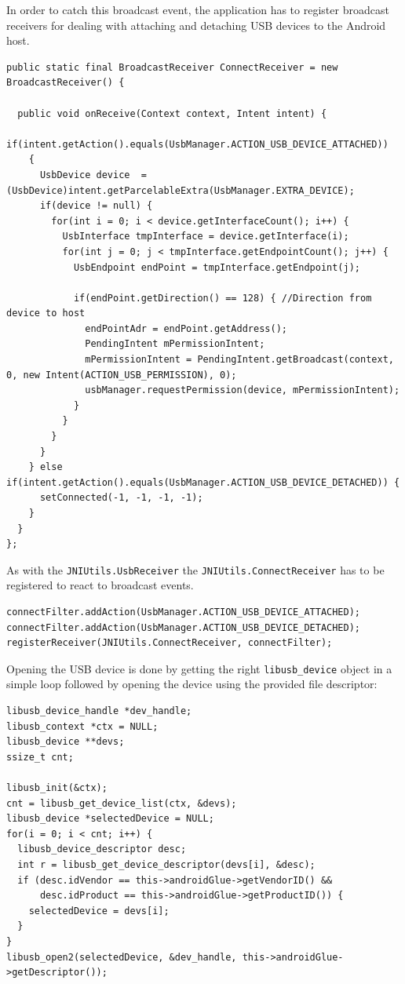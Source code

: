 In order to catch this broadcast event, the application has to register broadcast receivers for dealing with attaching and detaching USB devices to the Android host.

\begin{lstlisting}
public static final BroadcastReceiver ConnectReceiver = new BroadcastReceiver() {

  public void onReceive(Context context, Intent intent) {
    if(intent.getAction().equals(UsbManager.ACTION_USB_DEVICE_ATTACHED))
    {
      UsbDevice device  = (UsbDevice)intent.getParcelableExtra(UsbManager.EXTRA_DEVICE);
      if(device != null) {
        for(int i = 0; i < device.getInterfaceCount(); i++) {
          UsbInterface tmpInterface = device.getInterface(i);
          for(int j = 0; j < tmpInterface.getEndpointCount(); j++) {
            UsbEndpoint endPoint = tmpInterface.getEndpoint(j);

            if(endPoint.getDirection() == 128) { //Direction from device to host
              endPointAdr = endPoint.getAddress();
              PendingIntent mPermissionIntent;
              mPermissionIntent = PendingIntent.getBroadcast(context, 0, new Intent(ACTION_USB_PERMISSION), 0);
              usbManager.requestPermission(device, mPermissionIntent);
            }
          }
        }
      }
    } else if(intent.getAction().equals(UsbManager.ACTION_USB_DEVICE_DETACHED)) {
      setConnected(-1, -1, -1, -1);
    }
  }
};
\end{lstlisting}

As with the {\tt JNIUtils.UsbReceiver} the {\tt JNIUtils.ConnectReceiver} has to be registered to react to broadcast events.

\begin{lstlisting}
connectFilter.addAction(UsbManager.ACTION_USB_DEVICE_ATTACHED);
connectFilter.addAction(UsbManager.ACTION_USB_DEVICE_DETACHED);
registerReceiver(JNIUtils.ConnectReceiver, connectFilter);
\end{lstlisting}

Opening the USB device is done by getting the right {\tt libusb\_device} object in a simple loop followed by opening the device using the provided file descriptor:
\begin{lstlisting}
libusb_device_handle *dev_handle;
libusb_context *ctx = NULL;
libusb_device **devs;
ssize_t cnt;

libusb_init(&ctx);
cnt = libusb_get_device_list(ctx, &devs);
libusb_device *selectedDevice = NULL;
for(i = 0; i < cnt; i++) {
  libusb_device_descriptor desc;
  int r = libusb_get_device_descriptor(devs[i], &desc);
  if (desc.idVendor == this->androidGlue->getVendorID() &&
      desc.idProduct == this->androidGlue->getProductID()) {
    selectedDevice = devs[i];
  }
}
libusb_open2(selectedDevice, &dev_handle, this->androidGlue->getDescriptor());
\end{lstlisting}

